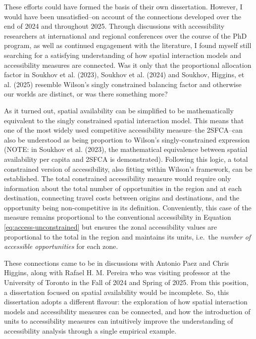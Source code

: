 \documentclass[
11pt, %
oneside, %
english, %
singlespacing, %
]{macthesis} %
\begin{document}
These efforts could have formed the basis of their own dissertation. However, I would have been unsatisfied--on account of the connections developed over the end of 2024 and throughout 2025. Through discussions with accessibility researchers at international and regional conferences over the course of the PhD program, as well as continued engagement with the literature, I found myself still searching for a satisfying understanding of how spatial interaction models and accessibility measures are connected. Was it only that the proportional allocation factor in Soukhov et al. (2023), Soukhov et al. (2024) and Soukhov, Higgins, et al. (2025) resemble Wilson's singly constrained balancing factor and otherwise our worlds are distinct, or was there something more?

As it turned out, spatial availability can be simplified to be mathematically equivalent to the singly constrained spatial interaction model. This means that one of the most widely used competitive accessibility measure--the 2SFCA--can also be understood as being proportion to Wilson's singly-constrained expression (NOTE: in Soukhov et al. (2023), the mathematical equivalence between spatial availability per capita and 2SFCA is demonstrated). Following this logic, a total constrained version of accessibility, also fitting within Wilson's framework, can be established. The total constrained accessibility measure would require only information about the total number of opportunities in the region and at each destination, connecting travel costs between origins and destinations, and the opportunity being non-competitive in its definition. Conveniently, this case of the measure remains proportional to the conventional accessibility in Equation \ref{eq:access-unconstrained} but ensures the zonal accessibility values are proportional to the total in the region and maintains its units, i.e.~the \emph{number of accessible opportunities} for each zone.

These connections came to be in discussions with Antonio Paez and Chris Higgins, along with Rafael H. M. Pereira who was visiting professor at the University of Toronto in the Fall of 2024 and Spring of 2025. From this position, a dissertation focused on spatial availability would be incomplete. So, this dissertation adopts a different flavour: the exploration of how spatial interaction models and accessibility measures can be connected, and how the introduction of units to accessibility measures can intuitively improve the understanding of accessibility analysis through a single empirical example.
\end{document}
